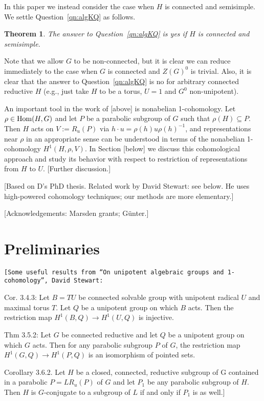 \documentclass[12pt]{amsart}
\newcommand\ra{\rightarrow}
\numberwithin{equation}{section}
\newtheorem{thm}[equation]{Theorem}
\theoremstyle{definition}
\theoremstyle{remark}
\theoremstyle{remark}
\begin{document}
In this paper we instead consider the case when $H$ is connected and semisimple.  We settle Question~\ref{qn:algKQ} as follows.

\begin{thm}
\label{thm:main}
 The answer to Question~\ref{qn:algKQ} is yes if $H$ is connected and semisimple.
\end{thm}

\noindent Note that we allow $G$ to be non-connected, but it is clear we can reduce immediately to the case when $G$ is connected and $Z(G)^0$ is trivial.  Also, it is clear that the answer to Question~\ref{qn:algKQ} is no for arbitrary connected reductive $H$ (e.g., just take $H$ to be a torus, $U= 1$ and $G^0$ non-unipotent).

An important tool in the work of [above] is nonabelian 1-cohomology.  Let $\rho\in {\rm Hom}(H,G)$ and let $P$ be a parabolic subgroup of $G$ such that $\rho(H)\subseteq P$.  Then $H$ acts on $V:= R_u(P)$ via $h\cdot u= \rho(h)u\rho(h)^{-1}$, and representations near $\rho$ in an appropriate sense can be understood in terms of the nonabelian 1-cohomology $H^1(H,\rho,V)$.  In Section [below] we discuss this cohomological approach and study its behavior with respect to restriction of representations from $H$ to $U$.  [Further discussion.]

[Based on D's PhD thesis.  Related work by David Stewart: see below.  He uses high-powered cohomology techniques; our methods are more elementary.]

[Acknowledgements: Marsden grants; G\"unter.]


\section{Preliminaries}

{\tt [Some useful results from ``On unipotent algebraic groups and 1-cohomology'', David Stewart:

Cor. 3.4.3: Let $B =TU$ be connected solvable group with unipotent radical $U$ and maximal torus $T$.  Let $Q$ be a unipotent group on which $B$ acts.  Then the restriction map $H^1(B,Q)\ra H^1(U,Q)$ is injective.

Thm 3.5.2: Let $G$ be connected reductive and let $Q$ be a unipotent group on which $G$ acts.  Then for any parabolic subgroup $P$ of $G$, the restriction map $H^1(G,Q)\ra H^1(P,Q)$ is an isomorphism of pointed sets.

Corollary 3.6.2. Let $H$ be a closed, connected, reductive subgroup of G contained in a parabolic $P = LR_u(P)$ of $G$ and let $P_1$ be any parabolic subgroup of $H$. Then
$H$ is $G$-conjugate to a subgroup of $L$ if and only if $P_1$ is as well.]}
\end{document}
